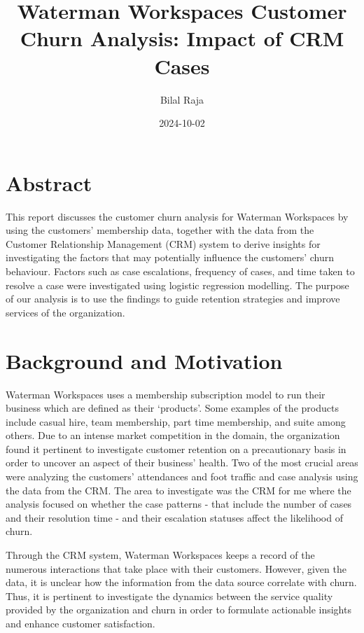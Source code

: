 \documentclass[
]{article}
\title{Waterman Workspaces Customer Churn Analysis: Impact of CRM Cases}
\author{Bilal Raja}
\date{2024-10-02}
\begin{document}
\maketitle

{
\setcounter{tocdepth}{2}
\tableofcontents
}
\section{Abstract}\label{abstract}

This report discusses the customer churn analysis for Waterman Workspaces by using the customers' membership data, together with the data from the Customer Relationship Management (CRM) system to derive insights for investigating the factors that may potentially influence the customers' churn behaviour. Factors such as case escalations, frequency of cases, and time taken to resolve a case were investigated using logistic regression modelling. The purpose of our analysis is to use the findings to guide retention strategies and improve services of the organization.

\section{Background and Motivation}\label{background-and-motivation}

Waterman Workspaces uses a membership subscription model to run their business which are defined as their `products'. Some examples of the products include casual hire, team membership, part time membership, and suite among others. Due to an intense market competition in the domain, the organization found it pertinent to investigate customer retention on a precautionary basis in order to uncover an aspect of their business' health. Two of the most crucial areas were analyzing the customers' attendances and foot traffic and case analysis using the data from the CRM. The area to investigate was the CRM for me where the analysis focused on whether the case patterns - that include the number of cases and their resolution time - and their escalation statuses affect the likelihood of churn.

Through the CRM system, Waterman Workspaces keeps a record of the numerous interactions that take place with their customers. However, given the data, it is unclear how the information from the data source correlate with churn. Thus, it is pertinent to investigate the dynamics between the service quality provided by the organization and churn in order to formulate actionable insights and enhance customer satisfaction.
\end{document}
